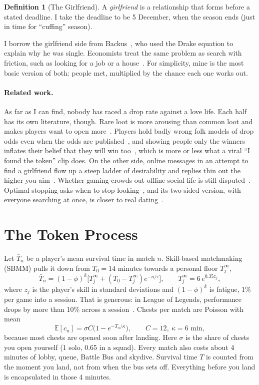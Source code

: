 \documentclass[11pt]{article}
\theoremstyle{definition}
\newtheorem{definition}{Definition}[section]
\theoremstyle{plain}
\begin{document}
\begin{definition}[The Girlfriend]
A \emph{girlfriend} is a relationship that forms before a stated deadline. I take the deadline to be 5 December, when the season ends (just in time for ``cuffing'' season).
\end{definition}

I borrow the girlfriend side from Backus~\cite{backus}, who used the Drake equation to explain why he was single. Economists treat the same problem as search with friction, such as looking for a job or a house~\cite{mortensen}. For simplicity, mine is the most basic version of both: people met, multiplied by the chance each one works out.

\paragraph{Related work.} As far as I can find, nobody has raced a drop rate against a love life. Each half has its own literature, though. Rare loot is more arousing than common loot and makes players want to open more~\cite{larche}. Players hold badly wrong folk models of drop odds even when the odds are published~\cite{wen,xiao}, and showing people only the winners inflates their belief that they will win too~\cite{cordes}, which is more or less what a viral ``I found the token'' clip does. On the other side, online messages in an attempt to find a girlfriend flow up a steep ladder of desirability and replies thin out the higher you aim~\cite{bruch}. Whether gaming crowds out offline social life is still disputed~\cite{kowert,domahidi}. Optimal stopping asks when to stop looking~\cite{chow}, and its two-sided version, with everyone searching at once, is closer to real dating~\cite{eriksson}.

\section{The Token Process}

Let $\bar T_n$ be a player's mean survival time in match $n$. Skill-based matchmaking (SBMM) pulls it down from $T_0 = 14$ minutes towards a personal floor $T^\infty_j$,
\begin{equation}
\bar T_{n} = (1-\phi)^{k}\big[T^\infty_j + (T_0 - T^\infty_j)e^{-n/\tau}\big], \qquad T^\infty_j = 6\,e^{0.35 z_j},
\end{equation}
where $z_j$ is the player's skill in standard deviations and $(1-\phi)^k$ is fatigue, 1\% per game into a session. That is generous: in League of Legends, performance drops by more than 10\% across a session~\cite{sapienza}. Chests per match are Poisson with mean
\begin{equation}
\mathbb{E}[c_n] = \sigma C\big(1 - e^{-T_n/\kappa}\big), \qquad C = 12,\ \kappa = 6 \text{ min},
\end{equation}
because most chests are opened soon after landing. Here $\sigma$ is the share of chests you open yourself (1 solo, 0.65 in a squad). Every match also costs about 4 minutes of lobby, queue, Battle Bus and skydive. Survival time $T$ is counted from the moment you land, not from when the bus sets off. Everything before you land is encapsulated in those 4 minutes.
\end{document}
